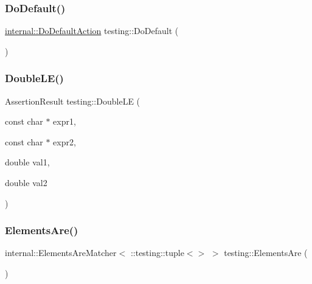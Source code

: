 \subsubsection{\texorpdfstring{DoDefault()}{DoDefault()}}
{\footnotesize\ttfamily \mbox{\hyperlink{classtesting_1_1internal_1_1DoDefaultAction}{internal\+::\+Do\+Default\+Action}} testing\+::\+Do\+Default (\begin{DoxyParamCaption}{ }\end{DoxyParamCaption})\hspace{0.3cm}{\ttfamily [inline]}}

\mbox{\label{namespacetesting_ae10e2bb304b74abd1b06a2d912a8b43b}} 
\subsubsection{\texorpdfstring{DoubleLE()}{DoubleLE()}}
{\footnotesize\ttfamily Assertion\+Result testing\+::\+Double\+LE (\begin{DoxyParamCaption}\item[{const char $\ast$}]{expr1,  }\item[{const char $\ast$}]{expr2,  }\item[{double}]{val1,  }\item[{double}]{val2 }\end{DoxyParamCaption})}

\mbox{\label{namespacetesting_a79cf4ae694bf8231dcf283b325405f27}} 
\subsubsection{\texorpdfstring{ElementsAre()}{ElementsAre()}\hspace{0.1cm}{\footnotesize\ttfamily [1/11]}}
{\footnotesize\ttfamily internal\+::\+Elements\+Are\+Matcher$<$ \+::testing\+::tuple$<$$>$ $>$ testing\+::\+Elements\+Are (\begin{DoxyParamCaption}{ }\end{DoxyParamCaption})\hspace{0.3cm}{\ttfamily [inline]}}

\mbox{\label{namespacetesting_aa35aa6c9638d989e9f4aaa6009f60589}} 
